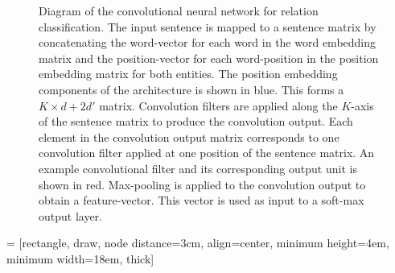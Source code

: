 \begin{figure}[h!]
	\caption{Diagram of the convolutional neural network for relation classification. The input sentence is mapped to a sentence matrix by concatenating the word-vector for each word in the word embedding matrix and the position-vector for each word-position in the position embedding matrix for both entities. The position embedding components of the architecture is shown in blue. This forms a $K \times d + 2d'$ matrix. Convolution filters are applied along the $K$-axis of the sentence matrix to produce the convolution output. Each element in the convolution output matrix corresponds to one convolution filter applied at one position of the sentence matrix. An example convolutional filter and its corresponding output unit is shown in red. Max-pooling is applied to the convolution output to obtain a feature-vector. This vector is used as input to a soft-max output layer.}
	\label{relation_architecture}
\end{figure}
\FloatBarrier
\newpage
{} = [rectangle, draw, node distance=3cm, align=center, minimum height=4em, minimum width=18em, thick]
